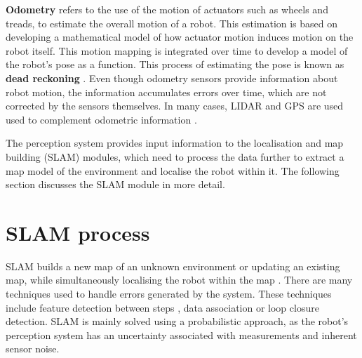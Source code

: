 \textbf{Odometry} refers to the use of the motion of actuators such as wheels and treads, to estimate the overall motion of a robot. This estimation is based on developing a mathematical model of how actuator motion induces motion on the robot itself. This motion mapping is integrated over time to develop a model of the robot's pose as a function. This process of estimating the pose is known as \textbf{dead reckoning} \cite{Siciliano2008b}. Even though odometry sensors provide information about robot motion, the information accumulates errors over time, which are not corrected by the sensors themselves. In many cases, LIDAR and GPS are used used to complement odometric information \cite{Grisetti2007}.

The perception system provides input information to the localisation and map building (SLAM) modules, which need to process the data further to extract a map model of the environment and localise the robot within it. The following section discusses the SLAM module in more detail.

%
\section{SLAM process}

SLAM builds a new map of an unknown environment or updating an existing map, while simultaneously localising the robot within the map \cite{Bailey2006b}. There are many techniques used to handle errors generated by the system. These techniques include feature detection between steps \cite{Kim2007a}, data association \cite{Nieto2003} or loop closure detection\cite{Labbe2014}. SLAM is mainly solved using a probabilistic approach, as the robot's perception system has an uncertainty associated with measurements and inherent sensor noise.

